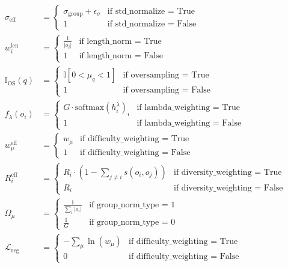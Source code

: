 \documentclass[11pt,a4paper]{article}
\begin{document}
\begin{align}
\sigma_{\text{eff}} &= \begin{cases} \sigma_{\text{group}} + \epsilon_\sigma & \text{if std\_normalize = True} \\ 1 & \text{if std\_normalize = False} \end{cases} \\[10pt]
w_i^{\text{len}} &= \begin{cases} \frac{1}{|o_i|} & \text{if length\_norm = True} \\ 1 & \text{if length\_norm = False} \end{cases} \\[10pt]
\mathbb{I}_{\text{OS}}(q) &= \begin{cases} \mathbb{I}[0 < \mu_q < 1] & \text{if oversampling = True} \\ 1 & \text{if oversampling = False} \end{cases} \\[10pt]
f_\lambda(o_i) &= \begin{cases} G \cdot \text{softmax}(h_i^\lambda)_i & \text{if lambda\_weighting = True} \\ 1 & \text{if lambda\_weighting = False} \end{cases} \\[10pt]
w_\mu^{\text{eff}} &= \begin{cases} w_\mu & \text{if difficulty\_weighting = True} \\ 1 & \text{if difficulty\_weighting = False} \end{cases} \\[10pt]
R_i^{\text{eff}} &= \begin{cases} R_i \cdot (1 - \sum_{j \neq i} s(o_i, o_j)) & \text{if diversity\_weighting = True} \\ R_i & \text{if diversity\_weighting = False} \end{cases} \\[10pt]
\Omega_\mu &= \begin{cases} \frac{1}{\sum_i |o_i|} & \text{if group\_norm\_type = 1} \\ \frac{1}{G} & \text{if group\_norm\_type = 0} \end{cases} \\[10pt]
\mathcal{L}_{\text{reg}} &= \begin{cases} -\sum_\mu \ln(w_\mu) & \text{if difficulty\_weighting = True} \\ 0 & \text{if difficulty\_weighting = False} \end{cases}
\end{align}
\end{document}

